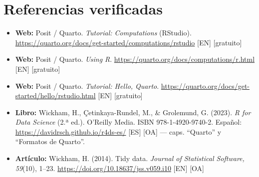 \section{Referencias verificadas}

\begin{itemize}
\tightlist
\item
  \textbf{Web:} Posit / Quarto. \emph{Tutorial: Computations} (RStudio).
  \url{https://quarto.org/docs/get-started/computations/rstudio}
  {[}EN{]} {[}gratuito{]}
\item
  \textbf{Web:} Posit / Quarto. \emph{Using R}.
  \url{https://quarto.org/docs/computations/r.html} {[}EN{]}
  {[}gratuito{]}
\item
  \textbf{Web:} Posit / Quarto. \emph{Tutorial: Hello, Quarto}.
  \url{https://quarto.org/docs/get-started/hello/rstudio.html} {[}EN{]}
  {[}gratuito{]}
\item
  \textbf{Libro:} Wickham, H., Çetinkaya-Rundel, M., \& Grolemund, G.
  (2023). \emph{R for Data Science} (2.ª ed.). O'Reilly Media. ISBN
  978-1-4920-9740-2. Español: \url{https://davidrsch.github.io/r4ds-es/}
  {[}ES{]} {[}OA{]} --- caps. ``Quarto'' y ``Formatos de Quarto''.
\item
  \textbf{Artículo:} Wickham, H. (2014). Tidy data. \emph{Journal of
  Statistical Software, 59}(10), 1--23.
  \url{https://doi.org/10.18637/jss.v059.i10} {[}EN{]} {[}OA{]}
\end{itemize}
